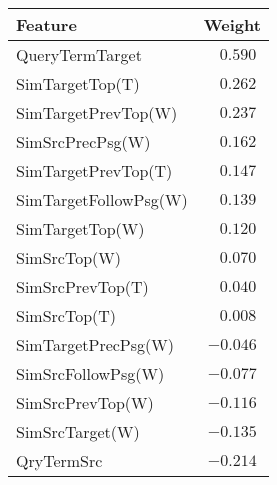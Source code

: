 \begin{tabular}{@{}lc@{}}
\toprule
Feature & Weight \\
\midrule
QueryTermTarget & $\;\:\:0.590$ \\ 
SimTargetTop(T) & $\;\:\:0.262$ \\ 
SimTargetPrevTop(W) & $\;\:\:0.237$ \\
SimSrcPrecPsg(W) & $\;\:\:0.162$ \\ SimTargetPrevTop(T) & $\;\:\:0.147$ \\ 
SimTargetFollowPsg(W) & $\;\:\:0.139$ \\ 
SimTargetTop(W) & $\;\:\:0.120$ \\ 
SimSrcTop(W) & $\;\:\:0.070$ \\ 
SimSrcPrevTop(T) & $\;\:\:0.040$ \\ 
SimSrcTop(T) & $\;\:\:0.008$ \\ 
SimTargetPrecPsg(W) & $-0.046$ \\ 
SimSrcFollowPsg(W) & $-0.077$ \\ 
SimSrcPrevTop(W) & $-0.116$ \\ 
SimSrcTarget(W) & $-0.135$ \\ 
QryTermSrc & $-0.214$ \\ 
\bottomrule
\end{tabular}
